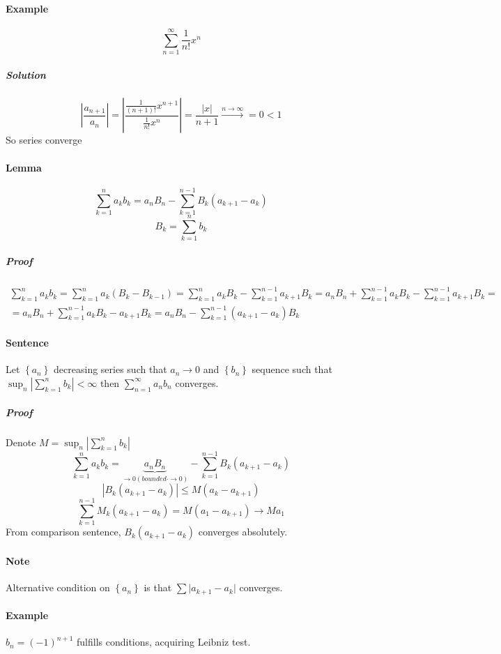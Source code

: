 \paragraph{Example}
$$\sum_{n=1}^\infty \frac{1}{n!}x^n$$
\subparagraph{Solution}
$$\left|\frac{a_{n+1}}{a_n}\right| = \left| \frac{\frac{1}{(n+1)!}x^{n+1}}{\frac{1}{n!}x^n} \right| = \frac{|x|}{n+1} \stackrel{n\to \infty}{\longrightarrow} = 0 < 1$$
So series converge
\paragraph{Lemma}
$$\sum_{k=1}^n a_kb_k = a_nB_n-\sum_{k=1}^{n-1} B_k\left(a_{k+1}-a_k\right)$$
$$B_k = \sum_{k=1}^n b_k$$
\subparagraph{Proof}
\begin{align*}
\sum_{k=1}^n a_kb_k = \sum_{k=1}^n a_k\left(B_k-B_{k-1}\right) = \sum_{k=1}^n a_kB_k-\sum_{k=1}^{n-1} a_{k+1}B_k = a_nB_n + \sum_{k=1}^{n-1} a_kB_k-\sum_{k=1}^{n-1} a_{k+1}B_k =\\= a_nB_n + \sum_{k=1}^{n-1} a_kB_k - a_{k+1}B_k = a_nB_n - \sum_{k=1}^{n-1} \left(a_{k+1} -a_k \right)B_k
\end{align*}
\paragraph{Sentence}
Let $\left\{ a_n \right\}$ decreasing series such that $a_n \to 0$ and $\left\{ b_n \right\}$ sequence such that $\sup_n \left|\sum_{k=1}^n b_k \right| < \infty$ then $\sum_{n=1}^\infty a_nb_n$ converges.
\subparagraph{Proof}
Denote $M = \sup_n \left|\sum_{k=1}^n b_k \right| $
$$\sum_{k=1}^n a_kb_k = \underbrace{a_nB_n}_{\to 0 (bounded \cdot \to 0)}-\sum_{k=1}^{n-1} B_k\left(a_{k+1}-a_k\right)$$
$$\left|B_k\left(a_{k+1}-a_k\right)\right| \leq M(a_k-a_{k+1})$$
$$\sum_{k=1}^{n-1} M_k\left(a_{k+1}-a_k\right) = M(a_1-a_{k+1}) \to Ma_1$$
From comparison sentence, $B_k\left(a_{k+1}-a_k\right)$ converges absolutely.
\paragraph{Note}
Alternative condition on $\left\{ a_n \right\}$ is that $\sum \big| a_{k+1} - a_k \big|$ converges.
\paragraph{Example}
$b_n = \left( -1 \right)^{n+1}$ fulfills conditions, acquiring Leibniz test.
